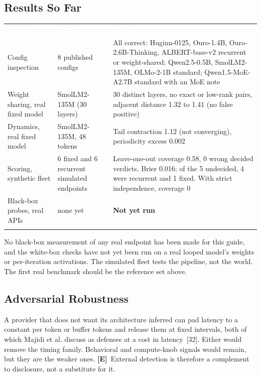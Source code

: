 \documentclass[11pt,letterpaper]{article}
\newcommand{\hd}[1]{\textcolor{white}{\bfseries #1}}
\newcommand{\tablefinish}{\arrayrulecolor{deepindigo}\specialrule{0.8pt}{0pt}{0pt}\arrayrulecolor{black}}
\newcommand{\zebra}{\rowcolors{2}{white}{paleindigo!75}}
\newcommand{\mE}{\textcolor{deepindigo}{\textbf{[E]}}}
\begin{document}
\subsection{Results So Far}
\label{sec:results}

{\footnotesize
\zebra
\begin{tabularx}{\textwidth}{L{3.3cm} L{3.4cm} Y}
\hd{Check} & \hd{Data} & \hd{Result} \\
Config inspection & 8 published configs & All correct: Huginn-0125, Ouro-1.4B, Ouro-2.6B-Thinking, ALBERT-base-v2 recurrent or weight-shared; Qwen2.5-0.5B, SmolLM2-135M, OLMo-2-1B standard; Qwen1.5-MoE-A2.7B standard with an MoE note \\
Weight sharing, real fixed model & SmolLM2-135M (30 layers) & 30 distinct layers, no exact or low-rank pairs, adjacent distance 1.32 to 1.41 (no false positive) \\
Dynamics, real fixed model & SmolLM2-135M, 48 tokens & Tail contraction 1.12 (not converging), periodicity excess 0.002 \\
Scoring, synthetic fleet & 6 fixed and 6 recurrent simulated endpoints & Leave-one-out coverage 0.58, 0 wrong decided verdicts, Brier 0.016; of the 5 undecided, 4 were recurrent and 1 fixed. With strict independence, coverage 0 \\
Black-box probes, real APIs & none yet & \textbf{Not yet run} \\
\tablefinish
\end{tabularx}\par}

\begin{warnbox}
No black-box measurement of any real endpoint has been made for this guide, and the white-box checks have not yet been run on a real looped model's weights or per-iteration activations. The simulated fleet tests the pipeline, not the world. The first real benchmark should be the reference set above.
\end{warnbox}

\subsection{Adversarial Robustness}

A provider that does not want its architecture inferred can pad latency to a constant per token or buffer tokens and release them at fixed intervals, both of which Majidi et al. discuss as defenses at a cost in latency~[32]. Either would remove the timing family. Behavioral and compute-knob signals would remain, but they are the weaker ones. \mE\ External detection is therefore a complement to disclosure, not a substitute for it.
\end{document}
